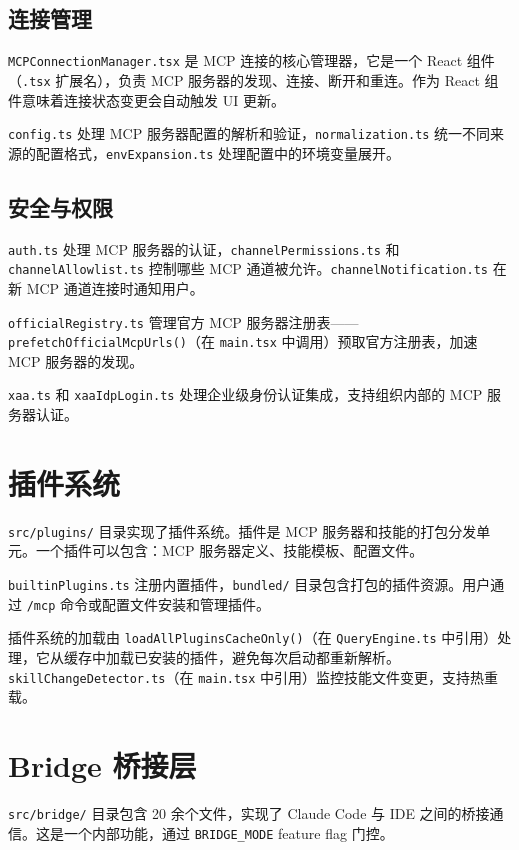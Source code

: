 \subsection{连接管理}

\texttt{MCPConnectionManager.tsx} 是 MCP 连接的核心管理器，它是一个 React 组件（\texttt{.tsx} 扩展名），负责 MCP 服务器的发现、连接、断开和重连。作为 React 组件意味着连接状态变更会自动触发 UI 更新。

\texttt{config.ts} 处理 MCP 服务器配置的解析和验证，\texttt{normalization.ts} 统一不同来源的配置格式，\texttt{envExpansion.ts} 处理配置中的环境变量展开。

\subsection{安全与权限}

\texttt{auth.ts} 处理 MCP 服务器的认证，\texttt{channelPermissions.ts} 和 \texttt{channelAllowlist.ts} 控制哪些 MCP 通道被允许。\texttt{channelNotification.ts} 在新 MCP 通道连接时通知用户。

\texttt{officialRegistry.ts} 管理官方 MCP 服务器注册表——\texttt{prefetchOfficialMcpUrls()}（在 \texttt{main.tsx} 中调用）预取官方注册表，加速 MCP 服务器的发现。

\texttt{xaa.ts} 和 \texttt{xaaIdpLogin.ts} 处理企业级身份认证集成，支持组织内部的 MCP 服务器认证。

\section{插件系统}

\texttt{src/plugins/} 目录实现了插件系统。插件是 MCP 服务器和技能的打包分发单元。一个插件可以包含：MCP 服务器定义、技能模板、配置文件。

\texttt{builtinPlugins.ts} 注册内置插件，\texttt{bundled/} 目录包含打包的插件资源。用户通过 \texttt{/mcp} 命令或配置文件安装和管理插件。

插件系统的加载由 \texttt{loadAllPluginsCacheOnly()}（在 \texttt{QueryEngine.ts} 中引用）处理，它从缓存中加载已安装的插件，避免每次启动都重新解析。\texttt{skillChangeDetector.ts}（在 \texttt{main.tsx} 中引用）监控技能文件变更，支持热重载。

\section{Bridge 桥接层}

\texttt{src/bridge/} 目录包含 20 余个文件，实现了 Claude Code 与 IDE 之间的桥接通信。这是一个内部功能，通过 \texttt{BRIDGE\_MODE} feature flag 门控。

